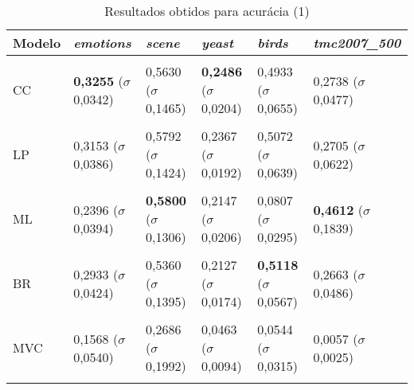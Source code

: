 
\begin{table}[htbp]
	\centering
	\caption{Resultados obtidos para acurácia (1)}
		\begin{tabular}
        { p{0.88in} p{0.88in} p{0.88in} p{0.88in} p{0.88in} p{0.88in} }
        
        \hline
Modelo & \textit{emotions} & \textit{scene} & \textit{yeast} & \textit{birds} & \textit{tmc2007\_500} \\ 
\hline \\

CC & \textbf{0,3255} \newline ($\sigma$ 0,0342) & 0,5630 \newline ($\sigma$ 0,1465) & \textbf{0,2486} \newline ($\sigma$ 0,0204) & 0,4933 \newline ($\sigma$ 0,0655) & 0,2738 \newline ($\sigma$ 0,0477) \\ \\
LP & 0,3153 \newline ($\sigma$ 0,0386) & 0,5792 \newline ($\sigma$ 0,1424) & 0,2367 \newline ($\sigma$ 0,0192) & 0,5072 \newline ($\sigma$ 0,0639) & 0,2705 \newline ($\sigma$ 0,0622) \\ \\
ML & 0,2396 \newline ($\sigma$ 0,0394) & \textbf{0,5800} \newline ($\sigma$ 0,1306) & 0,2147 \newline ($\sigma$ 0,0206) & 0,0807 \newline ($\sigma$ 0,0295) & \textbf{0,4612} \newline ($\sigma$ 0,1839) \\ \\
BR & 0,2933 \newline ($\sigma$ 0,0424) & 0,5360 \newline ($\sigma$ 0,1395) & 0,2127 \newline ($\sigma$ 0,0174) & \textbf{0,5118} \newline ($\sigma$ 0,0567) & 0,2663 \newline ($\sigma$ 0,0486) \\ \\
MVC & 0,1568 \newline ($\sigma$ 0,0540) & 0,2686 \newline ($\sigma$ 0,1992) & 0,0463 \newline ($\sigma$ 0,0094) & 0,0544 \newline ($\sigma$ 0,0315) & 0,0057 \newline ($\sigma$ 0,0025) \\ \\

\end{tabular}
\end{table}
